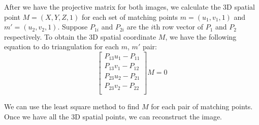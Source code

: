 After we have the projective matrix for both images, we calculate the 3D spatial point $M = (X, Y, Z, 1)$ for each set of matching points $m = (u_1, v_1, 1)$ and $m' = (u_2, v_2, 1)$. Suppose $P_{1i}$ and $P_{2i}$ are the $i$th row vector of $P_1$ and $P_2$ respectively. To obtain the 3D spatial coordinate $M$, we have the following equation to do triangulation for each $m$, $m'$ pair:
\begin{equation*}
  \left[ {\begin{array}{c}
   P_{13}u_1 - P_{11} \\
   P_{13}v_1 - P_{12} \\
   P_{23}u_2 - P_{21} \\
   P_{23}v_2 - P_{22} \\
  \end{array} } \right] M = 0
\end{equation*}

We can use the least square method to find $M$ for each pair of matching points. Once we have all the 3D spatial points, we can reconstruct the image.